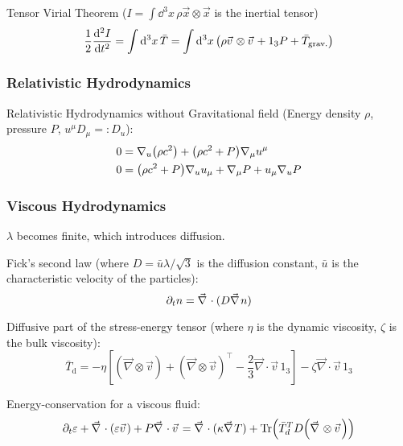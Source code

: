 			\noindent
			Tensor Virial Theorem ($I = 	\int \dd^3 x \, \rho \vec{x} \otimes \vec{x}$ is the inertial tensor)
			\begin{equation}
				\frac{1}{2}\dv[2]{I}{t}
				= \int \dd^3 x \, \bar{T}
				= \int \dd^3 x \, \qty(\rho \vec{v}\otimes\vec{v} + 1_3 P + \bar{T}_{\text{grav.}})
			\end{equation}

		\subsubsection{Relativistic Hydrodynamics}
			Relativistic Hydrodynamics without Gravitational field (Energy density $\rho$, pressure $P$, $u^\mu D_\mu =: D_u$):
			\begin{equation}
				\begin{aligned}
					0 &= \nabla_u \qty(\rho c^2) + \qty(\rho c^2 + P) \nabla_\mu u^\mu \\
					0 &= \qty(\rho c^2 + P) \nabla_u u_\mu + \nabla_\mu P + u_\mu \nabla_u P \\
				\end{aligned}
			\end{equation}

		\subsubsection{Viscous Hydrodynamics}
			$\lambda$ becomes finite, which introduces diffusion.

			Fick's second law (where $D = \bar{u} \lambda/\sqrt{3}$ is the diffusion constant, $\bar{u}$ is the characteristic velocity of the particles):
			\begin{equation}
				\partial_t n = \Nabla \cdot (D \Nabla n)
			\end{equation}

			\noindent
			Diffusive part of the stress-energy tensor (where $\eta$ is the dynamic viscosity, $\zeta$ is the bulk viscosity):
			\begin{equation}
				\bar{T}_{\mathrm{d}}=-\eta\left[\left(\vec{\nabla}\otimes\vec{v}\right)+\left(\vec{\nabla}\otimes\vec{v}\right)^{\intercal}-\frac{2}{3}\vec{\nabla}\cdot\vec{v}\,1_{3}\right]-\zeta\vec{\nabla}\cdot\vec{v}\,1_{3}
			\end{equation}

			\noindent
			Energy-conservation for a viscous fluid:
			\begin{equation}
				\partial_t \varepsilon + \Nabla \cdot (\varepsilon \vec{v}) + P \Nabla \cdot \vec{v} = \Nabla \cdot (\kappa \Nabla T) + \tr\qty(\bar{T}_d^T D \qty(\Nabla \otimes\vec{v}))
			\end{equation}

